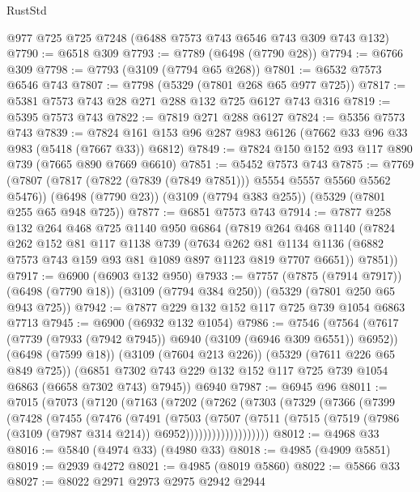 \begin{lexlean}{RustStd}
\begin{coremodule}
    @977
    @725
    @725
    @7248
    (@6488 @7573 @743 @6546 @743 @309 @743 @132)
@7790 := @6518 @309
@7793 := @7789 (@6498 (@7790 @28))
@7794 := @6766 @309
@7798 := @7793 (@3109 (@7794 @65 @268))
@7801 := @6532 @7573 @6546 @743
@7807 := @7798 (@5329 (@7801 @268 @65 @977 @725))
@7817 := @5381 @7573 @743 @28 @271 @288 @132 @725 @6127 @743 @316
@7819 := @5395 @7573 @743
@7822 := @7819 @271 @288 @6127
@7824 := @5356 @7573 @743
@7839 := @7824 @161 @153 @96 @287 @983 @6126 (@7662 @33 @96 @33 @983 (@5418 (@7667 @33)) @6812)
@7849 := @7824 @150 @152 @93 @117 @890 @739 (@7665 @890 @7669 @6610)
@7851 := @5452 @7573 @743
@7875 := @7769
    (@7807 (@7817 (@7822 (@7839 (@7849 @7851))) @5554 @5557 @5560 @5562 @5476))
    (@6498 (@7790 @23))
    (@3109 (@7794 @383 @255))
    (@5329 (@7801 @255 @65 @948 @725))
@7877 := @6851 @7573 @743
@7914 := @7877
    @258
    @132
    @264
    @468
    @725
    @1140
    @950
    @6864
    (@7819
      @264
      @468
      @1140
      (@7824
        @262
        @152
        @81
        @117
        @1138
        @739
        (@7634
          @262
          @81
          @1134
          @1136
          (@6882 @7573 @743 @159 @93 @81 @1089 @897 @1123 @819 @7707 @6651))
        @7851))
@7917 := @6900 (@6903 @132 @950)
@7933 := @7757
    (@7875 (@7914 @7917))
    (@6498 (@7790 @18))
    (@3109 (@7794 @384 @250))
    (@5329 (@7801 @250 @65 @943 @725))
@7942 := @7877 @229 @132 @152 @117 @725 @739 @1054 @6863 @7713
@7945 := @6900 (@6932 @132 @1054)
@7986 := @7546
    (@7564
      (@7617 (@7739 (@7933 (@7942 @7945)) @6940 (@3109 (@6946 @309 @6551)) @6952))
      (@6498 (@7599 @18))
      (@3109 (@7604 @213 @226))
      (@5329 (@7611 @226 @65 @849 @725))
      (@6851 @7302 @743 @229 @132 @152 @117 @725 @739 @1054 @6863 (@6658 @7302 @743) @7945))
    @6940
@7987 := @6945 @96
@8011 := @7015
    (@7073
      (@7120
        (@7163
          (@7202
            (@7262
              (@7303
                (@7329
                  (@7366
                    (@7399
                      (@7428
                        (@7455
                          (@7476
                            (@7491
                              (@7503
                                (@7507
                                  (@7511
                                    (@7515
                                      (@7519
                                        (@7986 (@3109 (@7987 @314 @214)) @6952)))))))))))))))))))
@8012 := @4968 @33
@8016 := @5840 (@4974 @33) (@4980 @33)
@8018 := @4985 (@4909 @5851)
@8019 := @2939 @4272
@8021 := @4985 (@8019 @5860)
@8022 := @5866 @33
@8027 := @8022 @2971 @2973 @2975 @2942 @2944

\end{coremodule}
\end{lexlean}
